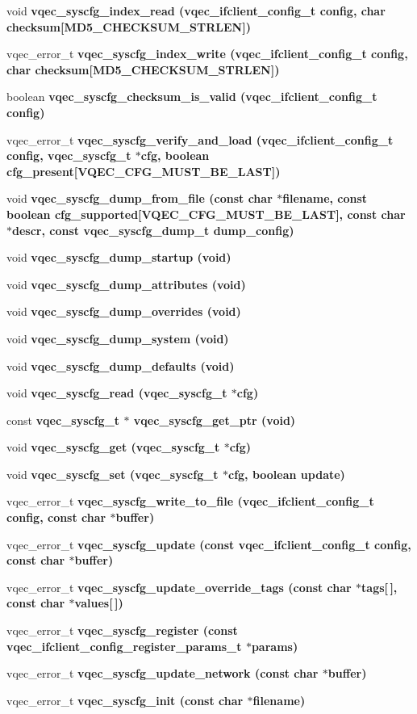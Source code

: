 \begin{CompactItemize}
\item 
void \bf{vqec\_\-syscfg\_\-index\_\-read} (\bf{vqec\_\-ifclient\_\-config\_\-t} config, char checksum[MD5\_\-CHECKSUM\_\-STRLEN])
\item 
vqec\_\-error\_\-t \bf{vqec\_\-syscfg\_\-index\_\-write} (\bf{vqec\_\-ifclient\_\-config\_\-t} config, char checksum[MD5\_\-CHECKSUM\_\-STRLEN])
\item 
boolean \bf{vqec\_\-syscfg\_\-checksum\_\-is\_\-valid} (\bf{vqec\_\-ifclient\_\-config\_\-t} config)
\item 
vqec\_\-error\_\-t \bf{vqec\_\-syscfg\_\-verify\_\-and\_\-load} (\bf{vqec\_\-ifclient\_\-config\_\-t} config, \bf{vqec\_\-syscfg\_\-t} $\ast$cfg, boolean cfg\_\-present[\bf{VQEC\_\-CFG\_\-MUST\_\-BE\_\-LAST}])
\item 
void \bf{vqec\_\-syscfg\_\-dump\_\-from\_\-file} (const char $\ast$\bf{filename}, const boolean cfg\_\-supported[\bf{VQEC\_\-CFG\_\-MUST\_\-BE\_\-LAST}], const char $\ast$descr, const \bf{vqec\_\-syscfg\_\-dump\_\-t} dump\_\-config)
\item 
void \bf{vqec\_\-syscfg\_\-dump\_\-startup} (void)
\item 
void \bf{vqec\_\-syscfg\_\-dump\_\-attributes} (void)
\item 
void \bf{vqec\_\-syscfg\_\-dump\_\-overrides} (void)
\item 
void \bf{vqec\_\-syscfg\_\-dump\_\-system} (void)
\item 
void \bf{vqec\_\-syscfg\_\-dump\_\-defaults} (void)
\item 
void \bf{vqec\_\-syscfg\_\-read} (\bf{vqec\_\-syscfg\_\-t} $\ast$cfg)
\item 
const \bf{vqec\_\-syscfg\_\-t} $\ast$ \bf{vqec\_\-syscfg\_\-get\_\-ptr} (void)
\item 
void \bf{vqec\_\-syscfg\_\-get} (\bf{vqec\_\-syscfg\_\-t} $\ast$cfg)
\item 
void \bf{vqec\_\-syscfg\_\-set} (\bf{vqec\_\-syscfg\_\-t} $\ast$cfg, boolean update)
\item 
vqec\_\-error\_\-t \bf{vqec\_\-syscfg\_\-write\_\-to\_\-file} (\bf{vqec\_\-ifclient\_\-config\_\-t} config, const char $\ast$buffer)
\item 
vqec\_\-error\_\-t \bf{vqec\_\-syscfg\_\-update} (const \bf{vqec\_\-ifclient\_\-config\_\-t} config, const char $\ast$buffer)
\item 
vqec\_\-error\_\-t \bf{vqec\_\-syscfg\_\-update\_\-override\_\-tags} (const char $\ast$tags[$\,$], const char $\ast$values[$\,$])
\item 
vqec\_\-error\_\-t \bf{vqec\_\-syscfg\_\-register} (const \bf{vqec\_\-ifclient\_\-config\_\-register\_\-params\_\-t} $\ast$params)
\item 
vqec\_\-error\_\-t \bf{vqec\_\-syscfg\_\-update\_\-network} (const char $\ast$buffer)
\item 
vqec\_\-error\_\-t \bf{vqec\_\-syscfg\_\-init} (const char $\ast$\bf{filename})
\end{CompactItemize}
